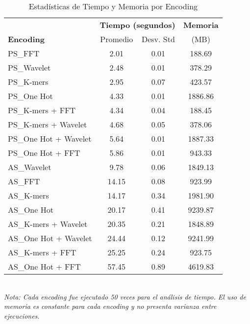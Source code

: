 \begin{table*}[htbp]
\centering
\caption{Estadísticas de Tiempo y Memoria por Encoding}
\label{tab:encoding_stats}
\scriptsize
\begin{tabular}{lccc}
\toprule
& \multicolumn{2}{c}{\textbf{Tiempo (segundos)}} & \textbf{Memoria} \\
\cmidrule(lr){2-3} \cmidrule(lr){4-4}
\textbf{Encoding} & Promedio & Desv. Std & (MB) \\
\midrule
PS\_FFT & 2.01 & 0.01 & 188.69 \\
PS\_Wavelet & 2.48 & 0.01 & 378.29 \\
PS\_K-mers & 2.95 & 0.07 & 423.57 \\
PS\_One Hot & 4.33 & 0.01 & 1886.86 \\
PS\_K-mers + FFT & 4.34 & 0.04 & 188.45 \\
PS\_K-mers + Wavelet & 4.68 & 0.05 & 378.06 \\
PS\_One Hot + Wavelet & 5.64 & 0.01 & 1887.33 \\
PS\_One Hot + FFT & 5.86 & 0.01 & 943.33 \\
AS\_Wavelet & 9.78 & 0.06 & 1849.13 \\
AS\_FFT & 14.15 & 0.08 & 923.99 \\
AS\_K-mers & 14.17 & 0.34 & 1981.90 \\
AS\_One Hot & 20.17 & 0.41 & 9239.87 \\
AS\_K-mers + Wavelet & 20.35 & 0.21 & 1848.89 \\
AS\_One Hot + Wavelet & 24.44 & 0.12 & 9241.99 \\
AS\_K-mers + FFT & 25.25 & 0.24 & 923.75 \\
AS\_One Hot + FFT & 57.45 & 0.89 & 4619.83 \\
\bottomrule
\end{tabular}
\\[0.5em]
\footnotesize
\textit{Nota: Cada encoding fue ejecutado 50 veces para el análisis de tiempo. El uso de memoria es constante para cada encoding y no presenta varianza entre ejecuciones.}
\end{table*}